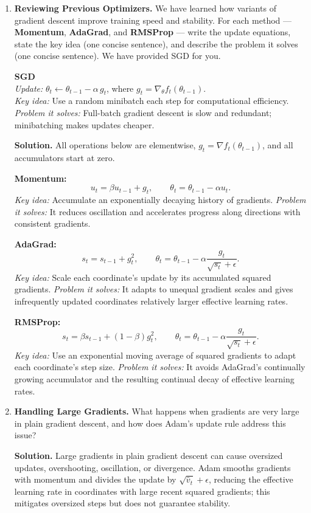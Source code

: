 \documentclass[11pt]{article}
\begin{document}
\newpage

\begin{enumerate}[label=\textbf{Q\arabic*.}, leftmargin=2.2em, resume]

  \item \textbf{Reviewing Previous Optimizers.}  
   We have learned how variants of gradient descent improve training speed and stability.  
  For each method --- \textbf{Momentum}, \textbf{AdaGrad}, and \textbf{RMSProp} --- write the update equations, state the key idea (one concise sentence), and describe the problem it solves (one concise sentence).  
  We have provided SGD for you.

  \textbf{SGD} \\
\emph{Update:} $\theta_t \gets \theta_{t-1} - \alpha\, g_t$, where $g_t = \nabla_\theta f_t(\theta_{t-1})$. \\
\emph{Key idea:} Use a random minibatch each step for computational efficiency. \\
\emph{Problem it solves:} Full-batch gradient descent is slow and redundant; minibatching makes updates cheaper.
\par\smallskip
\textbf{Solution.} All operations below are elementwise, $g_t=\nabla f_t(\theta_{t-1})$,
and all accumulators start at zero.

\textbf{Momentum:}
\[
u_t=\beta u_{t-1}+g_t,\qquad \theta_t=\theta_{t-1}-\alpha u_t.
\]
\emph{Key idea:} Accumulate an exponentially decaying history of gradients.
\emph{Problem it solves:} It reduces oscillation and accelerates progress along directions with consistent gradients.

\textbf{AdaGrad:}
\[
s_t=s_{t-1}+g_t^2,\qquad
\theta_t=\theta_{t-1}-\alpha\frac{g_t}{\sqrt{s_t}+\epsilon}.
\]
\emph{Key idea:} Scale each coordinate's update by its accumulated squared gradients.
\emph{Problem it solves:} It adapts to unequal gradient scales and gives infrequently updated coordinates relatively larger effective learning rates.

\textbf{RMSProp:}
\[
s_t=\beta s_{t-1}+(1-\beta)g_t^2,\qquad
\theta_t=\theta_{t-1}-\alpha\frac{g_t}{\sqrt{s_t}+\epsilon}.
\]
\emph{Key idea:} Use an exponential moving average of squared gradients to adapt each coordinate's step size.
\emph{Problem it solves:} It avoids AdaGrad's continually growing accumulator and the resulting continual decay of effective learning rates.


  \item \textbf{Handling Large Gradients.} What happens when gradients are very large in plain gradient descent, and how does Adam’s update rule address this issue?
  \par\smallskip
\textbf{Solution.} Large gradients in plain gradient descent can cause oversized updates,
overshooting, oscillation, or divergence.
Adam smooths gradients with momentum and divides the update by
$\sqrt{\hat v_t}+\epsilon$, reducing the effective learning rate in coordinates
with large recent squared gradients; this mitigates oversized steps but does not guarantee stability.



\end{enumerate}
\end{document}
